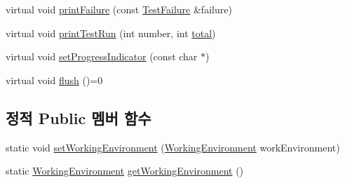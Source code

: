 \begin{DoxyCompactItemize}
\item 
virtual void \hyperlink{class_test_output_abda4b89457f485fa538443ee10aecfe8}{print\+Failure} (const \hyperlink{class_test_failure}{Test\+Failure} \&failure)
\item 
virtual void \hyperlink{class_test_output_a0cffc4628d21b0cd25649f9084927ca9}{print\+Test\+Run} (int number, int \hyperlink{test__intervals_8c_ac7af894858cf396a219d632f40afdc8d}{total})
\item 
virtual void \hyperlink{class_test_output_a97c09fc275d40b7ec559aaa91843cdcd}{set\+Progress\+Indicator} (const char $\ast$)
\item 
virtual void \hyperlink{class_test_output_a50ab71f4bc571f6e246b20db4b3dd131}{flush} ()=0
\end{DoxyCompactItemize}
\subsection*{정적 Public 멤버 함수}
\begin{DoxyCompactItemize}
\item 
static void \hyperlink{class_test_output_a25907ddd60d8454ca78f81edef6c77c3}{set\+Working\+Environment} (\hyperlink{class_test_output_a0541851f863713454486a9fb3080f766}{Working\+Environment} work\+Environment)
\item 
static \hyperlink{class_test_output_a0541851f863713454486a9fb3080f766}{Working\+Environment} \hyperlink{class_test_output_a90d5028d0f7f6f41ca2dced042a8709d}{get\+Working\+Environment} ()
\end{DoxyCompactItemize}
